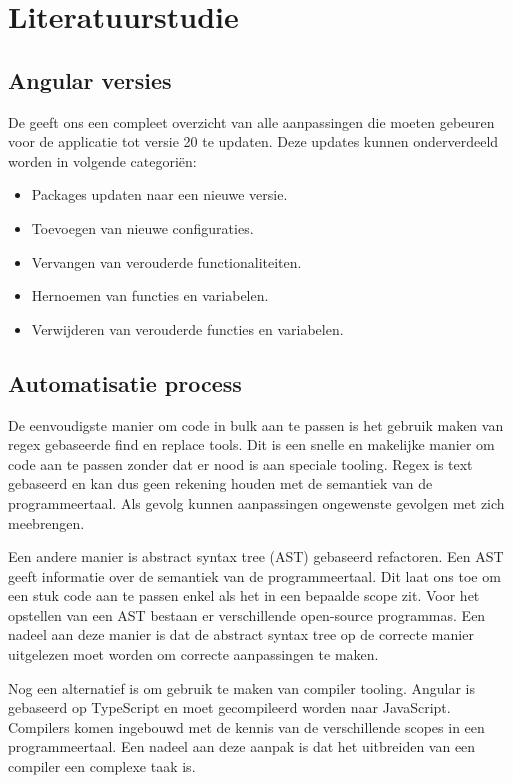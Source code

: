 \section{Literatuurstudie}
\label{sec:literatuurstudie}

\subsection{Angular versies}

De \textcite{Angular update guide} geeft ons een compleet overzicht van alle aanpassingen die moeten gebeuren voor de applicatie tot versie 20 te updaten. Deze updates kunnen onderverdeeld worden in volgende categoriën:

\begin{itemize}
  \item Packages updaten naar een nieuwe versie.
  \item Toevoegen van nieuwe configuraties.
  \item Vervangen van verouderde functionaliteiten. 
  \item Hernoemen van functies en variabelen.
  \item Verwijderen van verouderde functies en variabelen.
\end{itemize}


\subsection{Automatisatie process}

De eenvoudigste manier om code in bulk aan te passen is het gebruik maken van regex gebaseerde find en replace tools.
Dit is een snelle en makelijke manier om code aan te passen zonder dat er nood is aan speciale tooling.
Regex is text gebaseerd en kan dus geen rekening houden met de semantiek van de programmeertaal.
Als gevolg kunnen aanpassingen ongewenste gevolgen met zich meebrengen.

Een andere manier is abstract syntax tree (AST) gebaseerd refactoren.
Een AST geeft informatie over de semantiek van de programmeertaal.
Dit laat ons toe om een stuk code aan te passen enkel als het in een bepaalde scope zit.
Voor het opstellen van een AST bestaan er verschillende open-source programmas.
Een nadeel aan deze manier is dat de abstract syntax tree op de correcte manier uitgelezen moet worden om correcte aanpassingen te maken.

Nog een alternatief is om gebruik te maken van compiler tooling.
Angular is gebaseerd op TypeScript en moet gecompileerd worden naar JavaScript.
Compilers komen ingebouwd met de kennis van de verschillende scopes in een programmeertaal.
Een nadeel aan deze aanpak is dat het uitbreiden van een compiler een complexe taak is.


